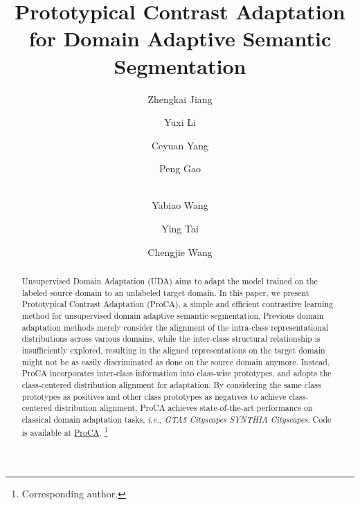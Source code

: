 \documentclass[runningheads]{llncs}
\newcommand\blfootnote[1]{\begingroup
\renewcommand\thefootnote{}\footnote{#1}\addtocounter{footnote}{-1}\endgroup
}
\begin{document}
\pagestyle{headings}
\mainmatter
\def\ECCVSubNumber{4992}  

\title{Prototypical Contrast Adaptation for Domain Adaptive Semantic Segmentation} 

\begin{comment}
\titlerunning{ECCV-22 submission ID \ECCVSubNumber} 
\authorrunning{ECCV-22 submission ID \ECCVSubNumber} 
\author{Anonymous ECCV submission}
\institute{Paper ID \ECCVSubNumber}
\end{comment}


\author{Zhengkai Jiang \and 
Yuxi Li \and Ceyuan Yang \and
Peng Gao \and \\ Yabiao Wang\inst{1\dagger} \and
Ying Tai  \and
Chengjie Wang\inst{1\dagger}}
\maketitle
\begin{abstract}
Unsupervised Domain Adaptation (UDA) aims to adapt the model trained on the labeled source domain to an unlabeled target domain. In this paper, we present Prototypical Contrast Adaptation (ProCA), a simple and efficient contrastive learning method for unsupervised domain adaptive semantic segmentation. 
Previous domain adaptation methods merely consider the alignment of the intra-class representational distributions across various domains, while the inter-class structural relationship is insufficiently explored, resulting in the aligned representations on the target domain might not be as easily discriminated as done on the source domain anymore. 
Instead, ProCA incorporates inter-class information into class-wise prototypes, and adopts the class-centered distribution alignment for adaptation. By considering the same class prototypes as positives and other class prototypes as negatives to achieve class-centered distribution alignment, ProCA achieves state-of-the-art performance on classical domain adaptation tasks, {\em i.e., GTA5  Cityscapes  SYNTHIA  Cityscapes}. Code is available at \href{https://github.com/jiangzhengkai/ProCA}{ProCA}.
\blfootnote{ Corresponding author.}
\end{abstract}
\end{document}
